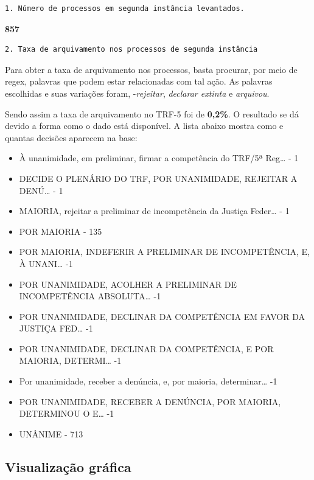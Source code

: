 \documentclass[12pt]{article}
\begin{document}
\begin{verbatim}
1. Número de processos em segunda instância levantados.
\end{verbatim}

\textbf{857}

\begin{verbatim}
2. Taxa de arquivamento nos processos de segunda instância
\end{verbatim}

Para obter a taxa de arquivamento nos processos, basta procurar, por
meio de regex, palavras que podem estar relacionadas com tal ação. As
palavras escolhidas e suas variações foram, -\emph{rejeitar},
\emph{declarar extinta} e \emph{arquivou}.

Sendo assim a taxa de arquivamento no TRF-5 foi de \textbf{0,2\%}. O
resultado se dá devido a forma como o dado está disponível. A lista
abaixo mostra como e quantas decisões aparecem na base:

\begin{itemize}
\item
  À unanimidade, em preliminar, firmar a competência do TRF/5ª
  Reg\ldots{} - 1
\item
  DECIDE O PLENÁRIO DO TRF, POR UNANIMIDADE, REJEITAR A DENÚ\ldots{} - 1
\item
  MAIORIA, rejeitar a preliminar de incompetência da Justiça
  Feder\ldots{} - 1
\item
  POR MAIORIA - 135
\item
  POR MAIORIA, INDEFERIR A PRELIMINAR DE INCOMPETÊNCIA, E, À
  UNANI\ldots{} -1
\item
  POR UNANIMIDADE, ACOLHER A PRELIMINAR DE INCOMPETÊNCIA
  ABSOLUTA\ldots{} -1
\item
  POR UNANIMIDADE, DECLINAR DA COMPETÊNCIA EM FAVOR DA JUSTIÇA
  FED\ldots{} -1
\item
  POR UNANIMIDADE, DECLINAR DA COMPETÊNCIA, E POR MAIORIA,
  DETERMI\ldots{} -1
\item
  Por unanimidade, receber a denúncia, e, por maioria,
  determinar\ldots{} -1
\item
  POR UNANIMIDADE, RECEBER A DENÚNCIA, POR MAIORIA, DETERMINOU O
  E\ldots{} -1
\item
  UNÂNIME - 713
\end{itemize}

\subsection{Visualização gráfica}\label{visualizacao-grafica}
\end{document}
